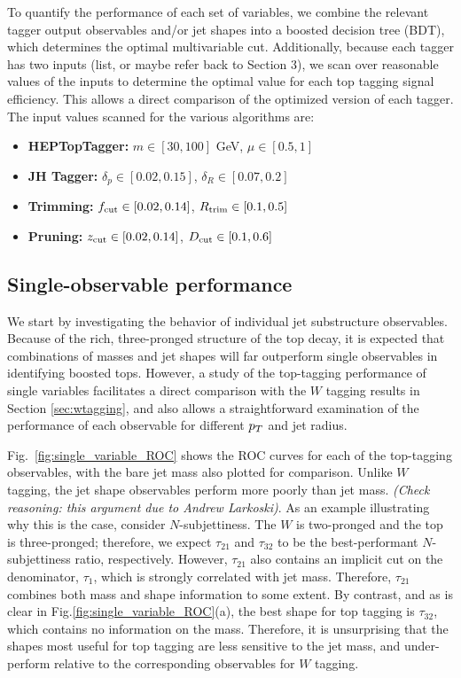 To quantify the performance of each set of variables, we combine the relevant tagger output observables and/or jet shapes into a boosted decision tree (BDT), which determines the optimal multivariable cut. Additionally, because each tagger has two inputs (list, or maybe refer back to Section 3), we scan over reasonable values of the inputs to determine the optimal value for each top tagging signal efficiency. This allows  a direct comparison of the optimized version of each tagger. The input values scanned for the various algorithms are:
%
\begin{itemize}
\item {\bf HEPTopTagger:} $m\in[30,100]$ GeV, $\mu\in[0.5,1]$
\item {\bf JH Tagger:} $\delta_p\in[0.02,0.15]$, $\delta_R\in[0.07,0.2]$
\item {\bf Trimming:} $f_{\rm cut}\in[0.02,0.14]$, $R_{\rm trim}\in[0.1,0.5]$
\item {\bf Pruning:} $z_{\rm cut}\in[0.02,0.14]$, $D_{\rm cut}\in[0.1,0.6]$
\end{itemize}

\subsection{Single-observable performance}
We start by investigating the behavior of individual jet substructure observables. Because of the rich, three-pronged structure of the top decay, it is expected that combinations of masses and jet shapes will far outperform single observables in identifying boosted tops. However, a study of the top-tagging performance of single variables facilitates a direct comparison with the $W$ tagging results in Section \ref{sec:wtagging}, and also allows a straightforward examination of the performance of each observable for different $p_T$ and jet radius.

Fig.~\ref{fig:single_variable_ROC} shows the ROC curves for each of the top-tagging observables, with the bare jet mass also plotted for comparison. Unlike $W$ tagging, the jet shape observables perform more poorly than jet mass. \emph{(Check reasoning: this argument due to Andrew Larkoski)}. As an example illustrating why this is the case, consider $N$-subjettiness. The $W$ is two-pronged and the top is three-pronged; therefore, we expect $\tau_{21}$ and $\tau_{32}$ to be the best-performant $N$-subjettiness ratio, respectively. However, $\tau_{21}$ also contains an implicit cut on the denominator, $\tau_1$, which is strongly correlated with jet mass. Therefore, $\tau_{21}$ combines both mass and shape information to some extent. By contrast, and as is clear in Fig.\ref{fig:single_variable_ROC}(a), the best shape for top tagging is $\tau_{32}$, which contains no information on the mass. Therefore, it is  unsurprising that the  shapes most useful for top tagging are less sensitive to the jet mass, and under-perform relative to the corresponding observables for $W$ tagging.

